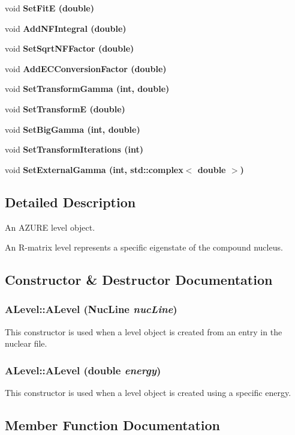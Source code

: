 \begin{CompactItemize}
void \bf{Set\-Fit\-E} (double)
\item 
void \bf{Add\-NFIntegral} (double)
\item 
void \bf{Set\-Sqrt\-NFFactor} (double)
\item 
void \bf{Add\-ECConversion\-Factor} (double)
\item 
void \bf{Set\-Transform\-Gamma} (int, double)
\item 
void \bf{Set\-Transform\-E} (double)
\item 
void \bf{Set\-Big\-Gamma} (int, double)
\item 
void \bf{Set\-Transform\-Iterations} (int)
\item 
void \bf{Set\-External\-Gamma} (int, std::complex$<$ double $>$)
\end{CompactItemize}


\subsection{Detailed Description}
An AZURE level object. 

An R-matrix level represents a specific eigenstate of the compound nucleus. 



\subsection{Constructor \& Destructor Documentation}
\subsubsection{\setlength{\rightskip}{0pt plus 5cm}ALevel::ALevel (Nuc\-Line {\em nuc\-Line})}\label{classALevel_aa406d92786470eb211e9fa0f5ba5496}


This constructor is used when a level object is created from an entry in the nuclear file. 
\subsubsection{\setlength{\rightskip}{0pt plus 5cm}ALevel::ALevel (double {\em energy})}\label{classALevel_e9c0cda96b6300572e75beade96eb0ca}


This constructor is used when a level object is created using a specific energy. 

\subsection{Member Function Documentation}
